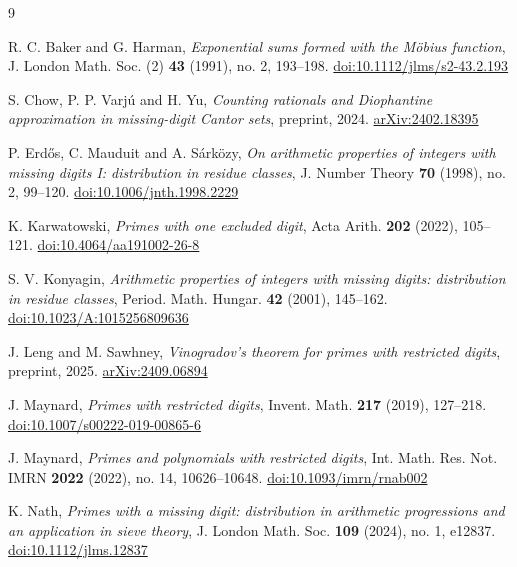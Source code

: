 \documentclass[11pt]{amsart}
\theoremstyle{definition}
\theoremstyle{remark}
\begin{document}
\begin{thebibliography}{9}

R. C. Baker and G. Harman, \emph{Exponential sums formed with the M\"obius function}, J. London Math. Soc. (2) \textbf{43} (1991), no. 2, 193--198. \href{https://doi.org/10.1112/jlms/s2-43.2.193}{doi:10.1112/jlms/s2-43.2.193}

S. Chow, P. P. Varj\'u and H. Yu, \emph{Counting rationals and Diophantine approximation in missing-digit Cantor sets}, preprint, 2024. \href{https://arxiv.org/abs/2402.18395}{arXiv:2402.18395}

P. Erd\H{o}s, C. Mauduit and A. S\'ark\"ozy, \emph{On arithmetic properties of integers with missing digits I: distribution in residue classes}, J. Number Theory \textbf{70} (1998), no. 2, 99--120. \href{https://doi.org/10.1006/jnth.1998.2229}{doi:10.1006/jnth.1998.2229}

K. Karwatowski, \emph{Primes with one excluded digit}, Acta Arith. \textbf{202} (2022), 105--121. \href{https://doi.org/10.4064/aa191002-26-8}{doi:10.4064/aa191002-26-8}

S. V. Konyagin, \emph{Arithmetic properties of integers with missing digits: distribution in residue classes}, Period. Math. Hungar. \textbf{42} (2001), 145--162. \href{https://doi.org/10.1023/A:1015256809636}{doi:10.1023/A:1015256809636}

J. Leng and M. Sawhney, \emph{Vinogradov's theorem for primes with restricted digits}, preprint, 2025. \href{https://arxiv.org/abs/2409.06894}{arXiv:2409.06894}

J. Maynard, \emph{Primes with restricted digits}, Invent. Math. \textbf{217} (2019), 127--218. \href{https://doi.org/10.1007/s00222-019-00865-6}{doi:10.1007/s00222-019-00865-6}

J. Maynard, \emph{Primes and polynomials with restricted digits}, Int. Math. Res. Not. IMRN \textbf{2022} (2022), no. 14, 10626--10648. \href{https://doi.org/10.1093/imrn/rnab002}{doi:10.1093/imrn/rnab002}

K. Nath, \emph{Primes with a missing digit: distribution in arithmetic progressions and an application in sieve theory}, J. London Math. Soc. \textbf{109} (2024), no. 1, e12837. \href{https://doi.org/10.1112/jlms.12837}{doi:10.1112/jlms.12837}

\end{thebibliography}
\end{document}

